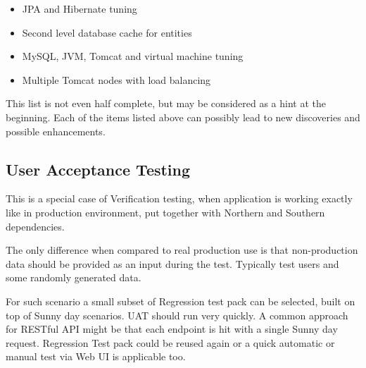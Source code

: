 	\begin{itemize}
		\item JPA and Hibernate tuning
		\item Second level database cache for entities
		\item MySQL, JVM, Tomcat and virtual machine tuning
		\item Multiple Tomcat nodes with load balancing 
	\end{itemize}
	
	This list is not even half complete, but may be considered as a hint at the beginning. Each of the items listed above
	can possibly lead to new discoveries and possible enhancements.
	
	\subsection{User Acceptance Testing}
	
	This is a special case of Verification testing, when application is working exactly like in production environment, put
	together with Northern and Southern dependencies.
	
	The only difference when compared to real production use is that non-production data should be provided as an input
	during the test. Typically test users and some randomly generated data.
	
	For such scenario a small subset of Regression test pack can be selected, built on top of Sunny day scenarios.
	UAT should run very quickly. A common approach for RESTful API might be that each endpoint is hit with a single Sunny
	day request. Regression Test pack could be reused again or a quick automatic or manual test via Web UI is applicable
	too.
